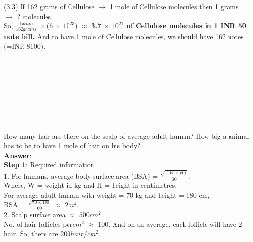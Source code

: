 \documentclass[11pt]{exam}
\begin{document}
\begin{questions}
{\begin{minipage}{42em}
(3.3) If 162 grams of Cellulose $\rightarrow$ 1 mole of Cellulose molecules then 1 grams $\rightarrow$ ? molecules\\ 

 So, $\frac{ 1 gram }{162 grams}$ $\times$ (6 $\times$ $10^{23}$) $\approx$ \textbf{3.7 $\times$ $10^{21}$ of Cellulose molecules in 1 INR 50 note bill.} And to have 1 mole of Cellulose molecules, we should have 162 notes (=INR 8100). \\ \\  

\end{minipage}}\\   \\ \\ \\ \\ \\               

  
  
\question
\label{Q3:Hair}

How many hair are there on the scalp of average adult human? How big a animal has to be to have 1 mole of hair on his body? \\
\textbf{Answer}: \\
\textbf{Step 1}: Required information.\\
                1. For humans, average body surface area (BSA)  = $\frac{\sqrt{(W \times H)}}
                   {60}$.\\
                   Where, W = weight in kg and H = height in centimetres.\\
                   For average adult human with weight = 70 kg and height = 180 cm, \\
                   BSA = $\frac{\sqrt{70\times180}}{60}$ $\approx$ $2m^{2}$.\\
                   
                2. Scalp surface area $\approx$ $500cm^{2}$.\\
                   No. of hair follicles per$cm^{2}$ $\approx$ 100. And on an average, each 
                  follicle will have 2 hair. So, there are $200 hair/cm^{2}$.\\ 
                   
\end{questions}
\end{document}
